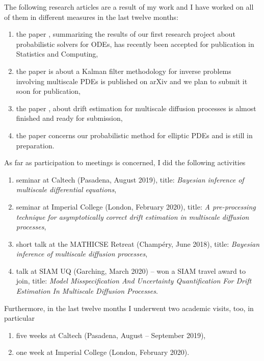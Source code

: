 \documentclass{article}
\theoremstyle{theorem}
\theoremstyle{definition}
\begin{document}
The following research articles are a result of my work and I have worked on all of them in different measures in the last twelve months:
\begin{enumerate}
	\item the paper \cite{AbG20}, summarizing the results of our first research project about probabilistic solvers for ODEs, has recently been accepted for publication in Statistics and Computing,
	\item the paper \cite{AGZ19} is about a Kalman filter methodology for inverse problems involving multiscale PDEs is published on arXiv and we plan to submit it soon for publication,
	\item the paper \cite{AGP20}, about drift estimation for multiscale diffusion processes is almost finished and ready for submission,
	\item the paper \cite{AbG20b} concerns our probabilistic method for elliptic PDEs and is still in preparation.
\end{enumerate}
As far as participation to meetings is concerned, I did the following activities
\begin{enumerate}
	\item seminar at Caltech (Pasadena, August 2019), title: \textit{Bayesian inference of multiscale differential equations},
	\item seminar at Imperial College (London, February 2020), title: \textit{A pre-processing technique for asymptotically correct drift estimation in multiscale diffusion processes},	
	\item short talk at the MATHICSE Retreat (Champéry, June 2018), title: \textit{Bayesian inference of multiscale diffusion processes},
	\item talk at SIAM UQ (Garching, March 2020) -- won a SIAM travel award to join, title: \textit{Model Misspecification And Uncertainty Quantification For Drift Estimation In Multiscale Diffusion Processes}.
\end{enumerate}	
Furthermore, in the last twelve months I underwent two academic visits, too, in particular
\begin{enumerate}
	\item five weeks at Caltech (Pasadena, August -- September 2019),
	\item one week at Imperial College (London, February 2020).
\end{enumerate}



\end{document}

